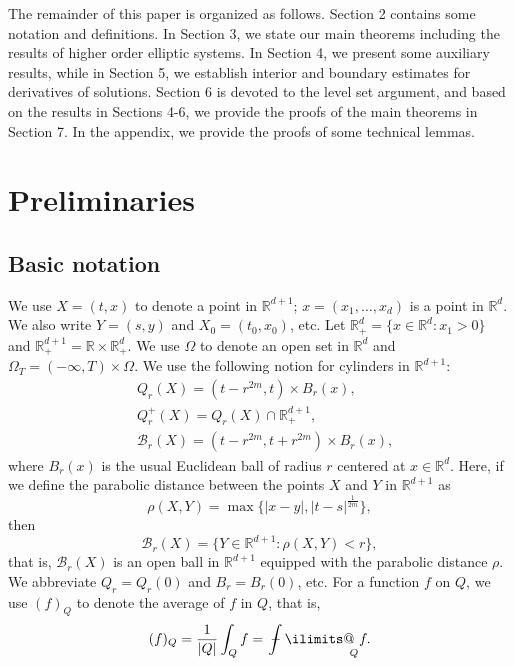 \documentclass[reqno]{amsart}
\numberwithin{equation}{section}
\theoremstyle{plain}
\theoremstyle{definition}
\theoremstyle{remark}
\begin{document}
The remainder of this paper is organized as follows.
Section 2 contains  some notation and definitions. 
In Section 3, we state our main theorems including the results of higher order elliptic systems.
In Section 4, we present  some auxiliary results, while in Section 5, we establish interior and boundary estimates for derivatives of solutions.
Section 6 is devoted to the level set argument, and based on the results in Sections 4-6, we provide the proofs of the main theorems in Section 7.
In the appendix, we provide the proofs of some technical lemmas.

\section{Preliminaries}		\label{sec2}

\subsection{Basic notation}

We use $X=(t,x)$ to denote a point in ${\mathbb{R}}^{d+1}$; $x=(x_1,\ldots,x_d)$ is a point in ${\mathbb{R}}^d$.
We also write $Y=(s,y)$ and $X_0=(t_0,x_0)$, etc.
Let ${\mathbb{R}}^d_+=\{x\in {\mathbb{R}}^d:x_1>0\}$ and ${\mathbb{R}}^{d+1}_+={\mathbb{R}}\times {\mathbb{R}}^d_+$.
We  use $\Omega$ to denote an open set in ${\mathbb{R}}^d$ and $\Omega_T=(-\infty,T)\times \Omega$.
We use the following notion for cylinders in ${\mathbb{R}}^{d+1}$:
\begin{align*}
&Q_r(X)=(t-r^{2m},t)\times B_r(x), \\
&Q_r^+(X)=Q_r(X)\cap {\mathbb{R}}^{d+1}_+,\\
&{\mathcal{B}}_r(X)=(t-r^{2m},t+r^{2m})\times B_r(x),
\end{align*}
where $B_r(x)$ is the usual Euclidean ball of radius $r$ centered at $x\in {\mathbb{R}}^d$.
Here, if we define the parabolic distance between the points $X$ and $Y$ in ${\mathbb{R}}^{d+1}$ as 
\begin{equation}							\label{eq0215_01}
\rho(X,Y)=\max \big\{|x-y|, |t-s|^{\frac{1}{2m}}\big\},
\end{equation}
then 
$$
{\mathcal{B}}_r(X)=\{Y\in {\mathbb{R}}^{d+1}:\rho(X,Y)<r\},
$$
that is, ${\mathcal{B}}_r(X)$ is an open ball in ${\mathbb{R}}^{d+1}$ equipped with the parabolic distance $\rho$.
We abbreviate $Q_r=Q_r(0)$ and $B_r=B_r(0)$, etc.
For a function $f$ on $Q$, we use  $\left( f \right)_Q$ to denote the average of $f$ in $Q$, that is,
\[
(f)_Q=\frac{1}{|Q|}\int_Q f={\operatorname{\,\,\text{\bf--}\kern-.98em\DOTSI\intop\ilimits@\!\!}}_Q f.
\]
\end{document}
